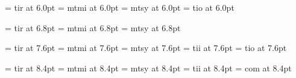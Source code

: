  \font\fivrm  = tir	at 6.0pt		%
 \font\fivmi  = mtmi	at 6.0pt		%
    \skewchar{} 		%
 \font\fivsy  = mtsy	at 6.0pt		%
    \skewchar{}		%
 \font\fivsl  = tio	at 6.0pt		%

 \font\sixrm  = tir	at 6.8pt		%
\font\sixmi  = mtmi	at 6.8pt		%
    \skewchar{} 		%
\font\sixsy  = mtsy	at 6.8pt		%
    \skewchar{}		%

 \font\sevrm  = tir	at 7.6pt		%
\font\sevmi  = mtmi	at 7.6pt		%
    \skewchar{} 		%
\font\sevsy  = mtsy	at 7.6pt		%
    \skewchar{}		%
 \font\sevit  = tii	at 7.6pt		%
 \font\sevsl  = tio	at 7.6pt		%

 \font\egtrm  = tir	at 8.4pt		%
\font\egtmi  = mtmi	at 8.4pt		%
    \skewchar{} 		%
\font\egtsy  = mtsy	at 8.4pt		%
    \skewchar{}		%
 \font\egtit  = tii	at 8.4pt		%
 \font\egttt  = com	at 8.4pt		%

